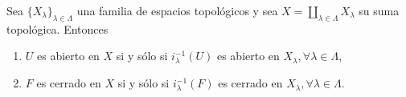 \begin{corollary}
Sea $\{ X_{\lambda} \}_{\lambda \in \Lambda}$ una familia de espacios topológicos y sea $X = \coprod_{\lambda \in \Lambda} X_{\lambda}$ su suma topológica. Entonces
\begin{enumerate}[label=\textnormal{(\roman*)}]
\item $U$ es abierto en $X$ si y sólo si $i^{-1}_{\lambda}(U)$ es abierto en $X_{\lambda}, \forall \lambda \in \Lambda$,
\item $F$ es cerrado en $X$ si y sólo si $i^{-1}_{\lambda}(F)$ es cerrado en $X_{\lambda}, \forall \lambda \in \Lambda$.
\end{enumerate}
\end{corollary}
